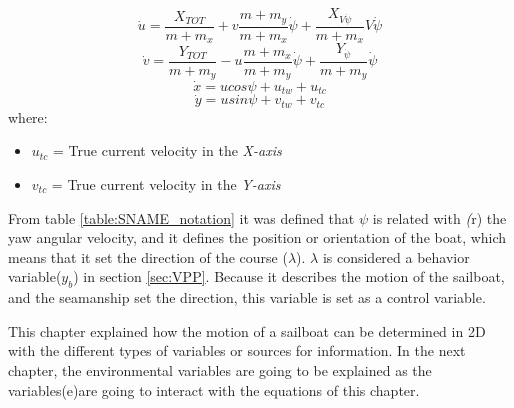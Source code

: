 \begin{equation}\label{eq:u_dot}
    \Dot{u}=\frac{X_{TOT}}{m+m_{x}}+v\frac{m+m_{y}}{m+m_{x}} \Dot{\psi}+\frac{X_{V\Dot{\psi}}}{m+m_{x}}V\Dot{\psi}
\end{equation}
\begin{equation}\label{v_dot}
    \Dot{v}=\frac{Y_{TOT}}{m+m_{y}}-u\frac{m+m_{x}}{m+m_{y}} \Dot{\psi}+ \frac{Y_{\Dot{\psi}}}{m+m_{y}}\Dot{\psi}
\end{equation}
\begin{equation}\label{x_dot}
    \Dot{x}=ucos\psi +u_{tw}+u_{tc}
\end{equation}
\begin{equation}\label{y_dot}
    \Dot{y}=usin\psi +v_{tw}+v_{tc}
\end{equation}
where:
\begin{itemize}
    \item $u_{tc}$ = True current velocity in the \textit{X-axis}
    \item $v_{tc}$ = True current velocity in the \textit{Y-axis}
\end{itemize}
From table \ref{table:SNAME_notation} it was defined that $\psi$ is related with \textit(r) the yaw angular velocity, and it defines the position or orientation of the boat, which means that it set the direction of the course ($\lambda$).  $\lambda$ is considered a behavior variable(\textit{$y_{b}$}) in section \ref{sec:VPP}. %
Because it describes the motion of the sailboat, and the seamanship set the direction, this variable is set as a control variable.\par

This chapter explained how the motion of a sailboat can be determined in 2D with the different types of variables or sources for information. In the next chapter, the environmental variables are going to be explained as the variables(e)are going to interact with the equations of this chapter.